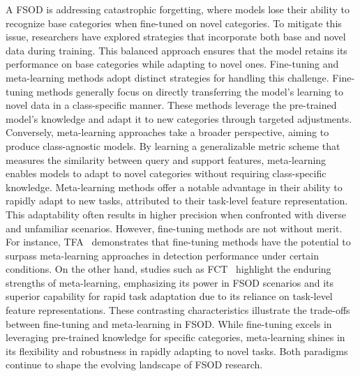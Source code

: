 A FSOD is addressing catastrophic forgetting, where models lose their ability to recognize base categories when fine-tuned on novel categories. To mitigate this issue, researchers have explored strategies that incorporate both base and novel data during training. This balanced approach ensures that the model retains its performance on base categories while adapting to novel ones.
Fine-tuning and meta-learning methods adopt distinct strategies for handling this challenge. Fine-tuning methods generally focus on directly transferring the model’s learning to novel data in a class-specific manner. These methods leverage the pre-trained model’s knowledge and adapt it to new categories through targeted adjustments. Conversely, meta-learning approaches take a broader perspective, aiming to produce class-agnostic models. By learning a generalizable metric scheme that measures the similarity between query and support features, meta-learning enables models to adapt to novel categories without requiring class-specific knowledge.
Meta-learning methods offer a notable advantage in their ability to rapidly adapt to new tasks, attributed to their task-level feature representation. This adaptability often results in higher precision when confronted with diverse and unfamiliar scenarios. However, fine-tuning methods are not without merit. For instance, TFA~\cite{Wang20TFA} demonstrates that fine-tuning methods have the potential to surpass meta-learning approaches in detection performance under certain conditions. On the other hand, studies such as FCT~\cite{Han22FCT} highlight the enduring strengths of meta-learning, emphasizing its power in FSOD scenarios and its superior capability for rapid task adaptation due to its reliance on task-level feature representations.
These contrasting characteristics illustrate the trade-offs between fine-tuning and meta-learning in FSOD. While fine-tuning excels in leveraging pre-trained knowledge for specific categories, meta-learning shines in its flexibility and robustness in rapidly adapting to novel tasks. Both paradigms continue to shape the evolving landscape of FSOD research.


